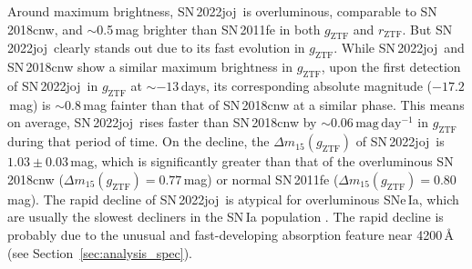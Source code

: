 \documentclass[twocolumn]{aastex631}
\newcommand{\sn}{SN\,2022joj}
\begin{document}
\begin{CJK*}{UTF8}{gbsn}
Around maximum brightness, \sn\ is overluminous, comparable to SN\,2018cnw, and $\sim$0.5\,mag brighter than SN\,2011fe in both $g_\mathrm{ZTF}$ and $r_\mathrm{ZTF}$. But \sn\ clearly stands out due to its fast evolution in $g_\mathrm{ZTF}$. While \sn\ and SN\,2018cnw show a similar maximum brightness in $g_\mathrm{ZTF}$, upon the first detection of \sn\ in $g_\mathrm{ZTF}$ at $\sim$$-13$\,days, its corresponding absolute magnitude ($-17.2$\,mag) is $\sim$0.8\,mag fainter than that of SN\,2018cnw at a similar phase. This means on average, \sn\ rises faster than SN\,2018cnw by $\sim$$0.06\,\mathrm{mag\,day^{-1}}$ in $g_\mathrm{ZTF}$ during that period of time. On the decline, the $\Delta m_{15}(g_\mathrm{ZTF})$ of \sn\ is $1.03\pm0.03$\,mag, which is significantly greater than that of the overluminous SN\,2018cnw ($\Delta m_{15}(g_\mathrm{ZTF})=0.77$\,mag) or normal SN\,2011fe ($\Delta m_{15}(g_\mathrm{ZTF})=0.80$\,mag). The rapid decline of \sn\ is atypical for overluminous SNe\,Ia, which are usually the slowest decliners in the SN\,Ia population \citep{Phillips_1999, Taubenberger_2017}. The rapid decline is probably due to the unusual and fast-developing absorption feature near 4200\,\r{A} (see Section~\ref{sec:analysis_spec}).


\end{CJK*}
\end{document}
